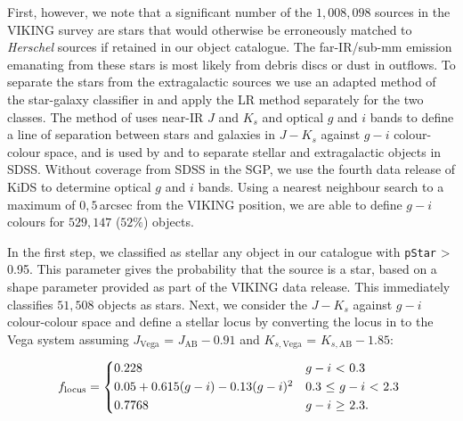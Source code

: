 First, however, we note that a significant number of the $1,008,098$ sources in the VIKING survey are stars that would otherwise be erroneously matched to \textit{Herschel} sources if retained in our object catalogue. The far-IR/sub-mm emission emanating from these stars is most likely from debris discs or dust in outflows. To separate the stars from the extragalactic sources we use an adapted method of the star-galaxy classifier in \citealt{Baldry_2010} and apply the LR method separately for the two classes. The method of \citealt{Baldry_2010} uses near-IR $J$ and $K_s$ and optical $g$ and $i$ bands to define a line of separation between stars and galaxies in $J - K_s$ against $g - i$ colour-colour space, and is used by \citealt{Bourne_2016} and \citealt{Furlanetto_2018} to separate stellar and extragalactic objects in SDSS. Without coverage from SDSS in the SGP, we use the fourth data release of KiDS to determine optical $g$ and $i$ bands. Using a nearest neighbour search to a maximum of $0,5\,$arcsec from the VIKING position, we are able to define $g - i$ colours for $529,147$ ($52\%$) objects.

In the first step, we classified as stellar any object in our catalogue with \texttt{pStar} > 0.95. This parameter gives the probability that the source is a star, based on a shape parameter provided as part of the VIKING data release. This immediately classifies $51,508$ objects as stars. Next, we consider the $J - K_s$ against $g - i$ colour-colour space and define a stellar locus by converting the locus in \citealt{Baldry_2010} to the Vega system assuming $J_{\textrm{Vega}}$ = $J_{\textrm{AB}} - 0.91$ and $K_{s,\textrm{Vega}}$ = $K_{s,\textrm{AB}} - 1.85$:

\begin{equation}
    f_{\textrm{locus}} = 
    \begin{cases*}
        0.228 & $g-i$ < 0.3 \\
        0.05 + 0.615(g-i) - 0.13(g-i)^2 & 0.3 $\leq$ $g-i$ < 2.3 \\
        0.7768 & $g-i$ $\geq$ 2.3.
    \end{cases*}
\label{eq:stellar_locus}
\end{equation}

